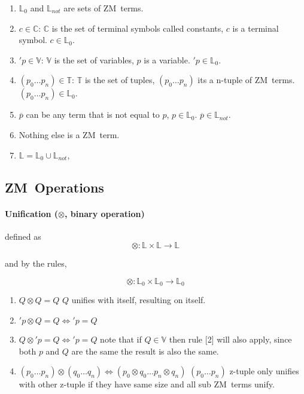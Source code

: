 \documentclass[11pt,a4paper]{report}
\newcommand{\zm}{ZM}
\newcommand{\var}[1]{'#1}
\newcommand{\unify}{\otimes}
\begin{document}
\begin{enumerate}
\item $\mathbb{L}_{0}$ and $\mathbb{L}_{not}$ are sets of \zm\ terms.
\item $c \in \mathbb{C}$: $\mathbb{C}$ is the set of terminal symbols called constants, $c$ is a terminal symbol. $c \in \mathbb{L}_{0}$.
\item $'p \in \mathbb{V}$: $\mathbb{V}$ is the set of variables, $p$ is a variable. $\var{p} \in \mathbb{L}_{0}$.
\item $(p_{0} \ldots p_{n}) \in \mathbb{T}$: $\mathbb{T}$ is the set of tuples, $(p_{0} \ldots p_{n})$ its a n-tuple of \zm\ terms. $(p_{0} \ldots p_{n}) \in \mathbb{L}_{0}$.
\item $\overline{p}$ can be any term that is not equal to $p$, $p \in \mathbb{L}_{0}$. $\overline{p} \in \mathbb{L}_{not}$. 
\item Nothing else is a \zm\ term.
\item $\mathbb{L} = \mathbb{L}_{0} \cup \mathbb{L}_{not}$,
\end{enumerate}


\subsection{\zm\ Operations}

\paragraph{Unification ($\unify$, binary operation)} defined as 
\[
    \unify: \mathbb{L} \times \mathbb{L} \rightarrow \mathbb{L}
\] 

and by the rules,

\[
    \unify: \mathbb{L}_{0} \times \mathbb{L}_{0} \rightarrow \mathbb{L}_{0} 
\]

\begin{enumerate}
\item $Q \unify Q = Q$
    \subitem $Q$ unifies with itself, resulting on itself.

\item $\var{p} \unify Q = Q \iff \var{p} = Q$
\item $Q \unify \var{p} = Q \iff \var{p} = Q$
    \subitem note that if $Q \in \mathbb{V}$ then rule [2] will also apply, since both $p$ and $Q$ are the same the result is also the same. 

\item $(p_{0} \ldots p_{n}) \unify (q_{0} \ldots q_{n}) \iff (p_{0} \unify q_{0} \ldots p_{n} \unify q_{n})$
    \subitem $(p_{0} \ldots p_{n})$ z-tuple only unifies with other z-tuple if they have same size and all sub \zm\ terms unify.
    
\end{enumerate}
\end{document}
